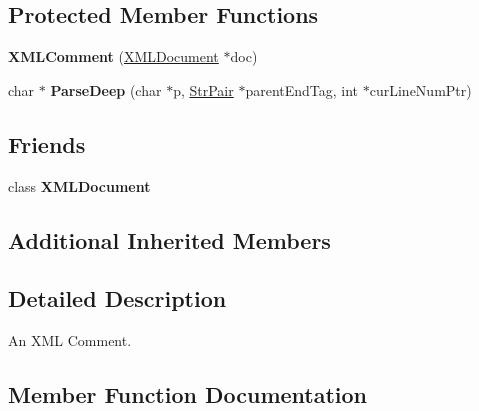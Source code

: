 \subsection*{Protected Member Functions}
\begin{DoxyCompactItemize}
\item 
\mbox{\label{classtinyxml2_1_1_x_m_l_comment_ae6463adc3edd93a8e5a9b2b7e99cdf91}} 
{\bfseries X\+M\+L\+Comment} (\mbox{\hyperlink{classtinyxml2_1_1_x_m_l_document}{X\+M\+L\+Document}} $\ast$doc)
\item 
\mbox{\label{classtinyxml2_1_1_x_m_l_comment_a3430281eed8d1023bafa9e633f44f509}} 
char $\ast$ {\bfseries Parse\+Deep} (char $\ast$p, \mbox{\hyperlink{classtinyxml2_1_1_str_pair}{Str\+Pair}} $\ast$parent\+End\+Tag, int $\ast$cur\+Line\+Num\+Ptr)
\end{DoxyCompactItemize}
\subsection*{Friends}
\begin{DoxyCompactItemize}
\item 
\mbox{\label{classtinyxml2_1_1_x_m_l_comment_a4eee3bda60c60a30e4e8cd4ea91c4c6e}} 
class {\bfseries X\+M\+L\+Document}
\end{DoxyCompactItemize}
\subsection*{Additional Inherited Members}


\subsection{Detailed Description}
An X\+ML Comment. 

\subsection{Member Function Documentation}
\mbox{\label{classtinyxml2_1_1_x_m_l_comment_a27b37d16cea01b5329dfbbb4f9508e39}} 
